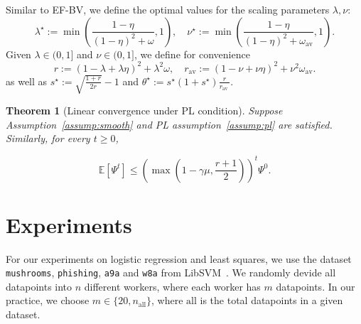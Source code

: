 \documentclass{article} %
\newcommand{\algname}[1]{{\sf\green\relscale{0.90}#1}\xspace}
\theoremstyle{plain}
\newtheorem{theorem}{Theorem}[section]
\theoremstyle{definition}
\theoremstyle{remark}
\newcommand{\green}{\color{mydarkgreen}}
\begin{document}
   Similar to \algname{EF-BV}, we define the optimal values for the scaling parameters $\lambda, \nu$:
   $$
   \lambda^{\star}:=\min \left(\frac{1-\eta}{(1-\eta)^{2}+\omega}, 1\right), \quad \nu^{\star}:=\min \left(\frac{1-\eta}{(1-\eta)^{2}+\omega_{\mathrm{av}}}, 1\right) .
   $$
   Given $\lambda \in(0,1]$ and $\nu \in(0,1]$, we define for convenience
   $$
   r:=(1-\lambda+\lambda \eta)^{2}+\lambda^{2} \omega, \quad r_{\mathrm{av}}:=(1-\nu+\nu \eta)^{2}+\nu^{2} \omega_{\mathrm{av}} .
   $$
   as well as $s^{\star}:=\sqrt{\frac{1+r}{2 r}}-1$ and $\theta^{\star}:=s^{\star}\left(1+s^{\star}\right) \frac{r}{r_{\text {av }}}$.

   \begin{theorem}[Linear convergence under PL condition]\label{thm:main_pl}
      Suppose Assumption~\ref{assump:smooth} and PL assumption~\ref{assump:pl} are satisfied. Similarly, for every $t\geq 0$, 

      \begin{equation}
         \mathbb{E}\left[\Psi^{t}\right] \leq\left(\max \left(1-\gamma \mu, \frac{r+1}{2}\right)\right)^{t} \Psi^{0}.
         \end{equation}
   \end{theorem}


   

   

\section{Experiments}
For our experiments on logistic regression and least squares, we use the dataset \texttt{mushrooms}, \texttt{phishing}, \texttt{a9a} and \texttt{w8a} from LibSVM~\cite{chang2011libsvm}. We randomly devide all datapoints into $n$ different workers, where each worker has $m$ datapoints. In our practice, we choose $m \in \{20, n_{\mathrm{all}}\}$, where $\mathrm{all}$ is the total datapoints in a given dataset. 
\end{document}
